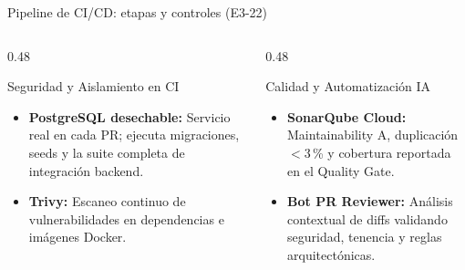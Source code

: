 \begin{frame}{Pipeline de CI/CD: etapas y controles (E3-22)}
\begin{columns}[T,onlytextwidth]
\begin{column}{0.48\textwidth}
\begin{block}{Seguridad y Aislamiento en CI}
\scriptsize
\begin{itemize}
  \item \textbf{PostgreSQL desechable:} Servicio real en cada PR; ejecuta migraciones, seeds y la suite completa de integración backend.
  \item \textbf{Trivy:} Escaneo continuo de vulnerabilidades en dependencias e imágenes Docker.
\end{itemize}
\end{block}
\end{column}
\begin{column}{0.48\textwidth}
\begin{block}{Calidad y Automatización IA}
\scriptsize
\begin{itemize}
  \item \textbf{SonarQube Cloud:} Maintainability A, duplicación $<$3\,\% y cobertura reportada en el Quality Gate.
  \item \textbf{Bot PR Reviewer:} Análisis contextual de diffs validando seguridad, tenencia y reglas arquitectónicas.
\end{itemize}
\end{block}
\end{column}
\end{columns}
\end{frame}

